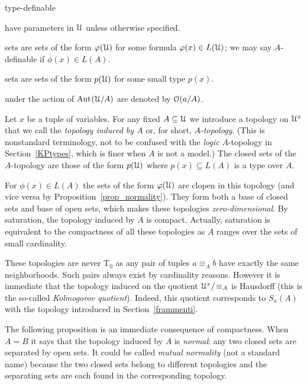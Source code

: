 \begin{litemize}{type-definable}
\item[\emph{formulas}] have parameters in $\EuScript U$ unless otherwise specified.
\item[\emph{definable}] sets are sets of the form $\varphi(\EuScript U)$ for some formula $\varphi(x)\in L(\EuScript U)$; we may say $A$-definable if $\phi(x)\in L(A)$.
\item[\emph{type-definable}] sets are sets of the form $p(\EuScript U)$ for some small type $p(x)$.
\item[\emph{orbits of tuples}] under the action of ${\rm Aut\kern.15ex}(\EuScript U/A)$ are denoted by $\EuScript O(a/A)$.
\end{litemize}

Let $x$ be a tuple of variables. For any fixed $A\subseteq \EuScript U$ we introduce a topology on $\EuScript U^{x}$ that we call the \emph{topology induced by $A$} or, for short, \emph{$A\mbox{-}$topology}. 
(This is nonstandard terminology, not to be confused with the \textit{logic\/} $A\mbox{-}$topology in Section~\ref{KPtypes}, which is finer when $A$ is not a model.)
The closed sets of the $A\mbox{-}$topology are those of the form $p(\EuScript U)$ where $p(x)\subseteq L(A)$ is a type over $A$.

For $\phi(x)\in L(A)$ the sets of the form $\varphi(\EuScript U)$ are clopen in this topology (and vice versa by Proposition~\ref{prop_normality}).
They form both a base of closed sets and base of open sets, which makes these topologies \textit{zero-dimensional}.
By saturation, the topology induced by $A$ is compact.
Actually, saturation is equivalent to the compactness of all these topologies as $A$ ranges over the sets of small cardinality.

These topologies are never T$_0$ as any pair of tuples $a\equiv_A b$ have exactly the same neighborhoods. Such pairs always exist by cardinality reasons. However it is immediate that the topology induced on the quotient $\EuScript U^{x}/\!\equiv_A$ is Hausdorff (this is the so-called \textit{Kolmogorov quotient}). Indeed, this quotient corresponds to $S_x(A)$ with the topology introduced in Section~\ref{frammenti}.

The following proposition is an immediate consequence of compactness. When $A=B$ it says that the topology induced by $A$ is \textit{normal}: any two closed sets are separated by open sets. It could be called \emph{mutual normality\/} (not a standard name) because the two closed sets belong to different topologies and the separating sets are each found in the corresponding topology.


